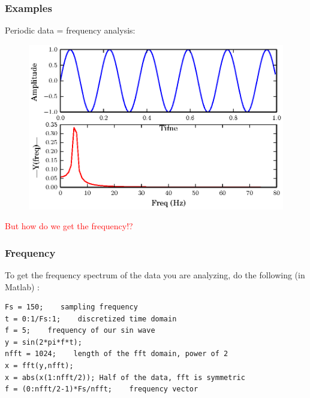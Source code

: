 \documentclass[serif]{beamer}
\begin{document}

\begin{frame}
\frametitle{Examples} 

Periodic data = frequency analysis: 

\begin{figure}[h]
\includegraphics[width=\textwidth,height=0.7\textheight]{./freq}
\end{figure}
 
 \textcolor{red}{But how do we get the frequency!?}

\end{frame}

%
\begin{frame}[fragile]
\frametitle{Frequency}
To get the frequency spectrum of the data you are analyzing, do the following (in Matlab) :
\ \\
\begin{verbatim}
Fs = 150;    sampling frequency 
t = 0:1/Fs:1;    discretized time domain
f = 5;    frequency of our sin wave
y = sin(2*pi*f*t);
nfft = 1024;    length of the fft domain, power of 2 
x = fft(y,nfft);
x = abs(x(1:nfft/2)); Half of the data, fft is symmetric
f = (0:nfft/2-1)*Fs/nfft;    frequency vector
\end{verbatim}

\end{frame}
\end{document}

